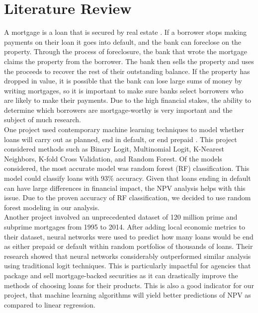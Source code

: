 \documentclass[12 pt]{uncw_thesis}
\theoremstyle{plain}
\theoremstyle{remark}
\theoremstyle{definition}
\begin{document}
\section{Literature Review}
A mortgage is a loan that is secured by real estate \cite{Fannie}. If a borrower stops making payments on their loan it goes into default, and the bank can foreclose on the property. Through the process of foreclosure, the bank  that  wrote the mortgage claims the property from the borrower. The bank then sells the property and uses the proceeds to recover the rest of their outstanding balance. If the property has dropped in value, it is possible that the bank can lose large sums of money by writing mortgages, so it is important to make sure banks select borrowers who are likely to make their payments. Due to the high financial stakes, the ability to determine which borrowers are mortgage-worthy is very important and the subject of much research.\\
One project used contemporary machine learning techniques to model whether loans will carry out as planned, end in default, or end prepaid \cite{Deng}. This project considered methods such as Binary Logit, Multinomial Logit, K-Nearest Neighbors, K-fold Cross Validation, and Random Forest. Of the models considered, the most accurate model was random forest (RF) classification. This model could classify loans with 93\% accuracy. Given that loans ending in default can have large differences in financial impact, the NPV analysis helps with this issue. Due to the proven accuracy of RF classification, we decided to use random forest modeling in our analysis\cite{Deng}. \\ 
Another project involved an unprecedented dataset of 120 million prime and subprime mortgages from 1995 to 2014\cite{Sirignano}. After adding local economic metrics to their dataset, neural networks were used to predict how many loans would be end as either prepaid or default within random portfolios of thousands of loans. Their research showed that neural networks considerably outperformed similar analysis using traditional logit techniques. This is particularly impactful for agencies that package and sell mortgage-backed securities as it can drastically improve the methods of choosing loans for their products. This is also a good indicator for our project, that machine learning algorithms will yield better predictions of NPV as compared to linear regression.
\end{document}
